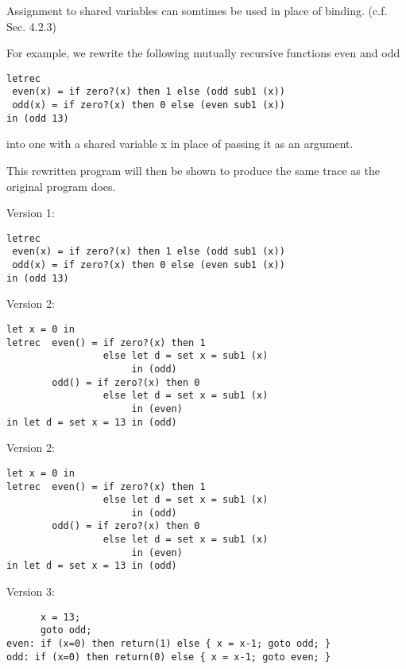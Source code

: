 \documentclass{article}
\begin{document}
\begin{huge}

Assignment to shared variables  can somtimes be used in place of binding. (c.f. Sec. 4.2.3)

For example, we rewrite the following mutually recursive functions even and odd
\begin{lstlisting}
letrec
 even(x) = if zero?(x) then 1 else (odd sub1 (x))
 odd(x) = if zero?(x) then 0 else (even sub1 (x))
in (odd 13)
\end{lstlisting}

into one with a shared variable x in place of passing it as an argument.

This rewritten program will then be shown to produce the same trace as the original program does.


Version 1:
\begin{lstlisting}
letrec
 even(x) = if zero?(x) then 1 else (odd sub1 (x))
 odd(x) = if zero?(x) then 0 else (even sub1 (x))
in (odd 13)
\end{lstlisting}

Version 2:
\begin{lstlisting}
let x = 0 in
letrec  even() = if zero?(x) then 1 
                 else let d = set x = sub1 (x) 
                      in (odd)
        odd() = if zero?(x) then 0 
                 else let d = set x = sub1 (x) 
                      in (even)
in let d = set x = 13 in (odd)
\end{lstlisting}

Version 2:
\begin{lstlisting}
let x = 0 in
letrec  even() = if zero?(x) then 1 
                 else let d = set x = sub1 (x) 
                      in (odd)
        odd() = if zero?(x) then 0 
                 else let d = set x = sub1 (x) 
                      in (even)
in let d = set x = 13 in (odd)
\end{lstlisting}
Version 3:
\begin{lstlisting}
      x = 13;
      goto odd;
even: if (x=0) then return(1) else { x = x-1; goto odd; }
odd: if (x=0) then return(0) else { x = x-1; goto even; } 
\end{lstlisting}


\end{huge}
\end{document}
